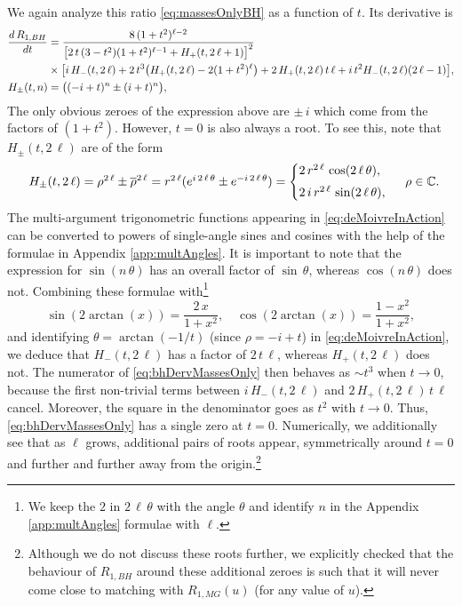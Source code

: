 \documentclass[12pt,a4paper]{article}
\begin{document}
We again analyze this ratio \eqref{eq:massesOnlyBH} as a function of $t$.
%
Its derivative is
\begin{align}
\label{eq:bhDervMassesOnly}\frac{d\,R_{1,BH}}{dt}&=\frac{8\,(1+t^2)^{\ell-2}}{\big[2\,t\,(3-t^2)(1+t^2)^{\ell-1}+H_+(t,2\,\ell+1)\big]^2}\\
&\times \big[i\,H_-(t,2\,\ell)+2\,t^3\big(H_+(t,2\,\ell)-2(1+t^2)^\ell\big)+2\,H_+(t,2\,\ell)\,t\,\ell+i\,t^2H_-(t,2\,\ell)(2\,\ell-1)\big],\notag\\
\nonumber H_{\pm}(t,n)&=\big((-i+t)^n\pm(i+t)^n\big),
\end{align}
The only obvious zeroes of the expression above are $\pm\,i$ which come from the factors of $(1+t^2)$. However, $t=0$ is also always a root. To see this, note that $H_{\pm}(t,2\,\ell)$ are of the form
\begin{align}
\begin{array}{rcl}
H_{\pm}(t,2\,\ell)=\rho^{2\,\ell}\pm\overline{\rho}^{2\,\ell}=r^{2\,\ell}(e^{i\,2\,\ell\,\theta}\pm e^{-i\,2\,\ell\,\theta})=
\left\{\begin{array}{@{}l@{}}
2\,r^{2\,\ell}\,\cos(2\,\ell\,\theta),\vspace{1mm}\\[\jot]
2\,i\,r^{2\,\ell}\,\sin(2\,\ell\,\theta),\vspace{1mm}
\vspace{-1mm}\end{array}\right.
\end{array}\quad\rho\in\mathbb{C}\label{eq:deMoivreInAction}.
\end{align}
The multi-argument trigonometric functions appearing in \eqref{eq:deMoivreInAction} can be converted to powers of single-angle sines and cosines with the help of the formulae in Appendix \ref{app:multAngles}. It is important to note that the expression for $\sin(n\,\theta)$ has an overall factor of $\sin\,\theta$, whereas $\cos(n\,\theta)$ does not. Combining these formulae with\footnote{We keep the $2$ in $2\,\ell\,\theta$ with the angle $\theta$ and identify $n$ in the Appendix \ref{app:multAngles} formulae with $\ell$.}
\begin{equation}
\sin(2\arctan(x))=\frac{2\,x}{1+x^2},\quad \cos(2\arctan(x))=\frac{1-x^2}{1+x^2},
\end{equation}
and identifying $\theta=\arctan(-1/t)$ (since $\rho=-i+t$) in \eqref{eq:deMoivreInAction}, we deduce that $H_-(t,2\,\ell)$ has a factor of $2\,t\,\ell$, whereas $H_+(t,2\,\ell)$ does not. The numerator of \eqref{eq:bhDervMassesOnly} then behaves as $\sim t^3$ when $t\rightarrow0$, because the first non-trivial terms between $i\,H_-(t,2\,\ell)$ and $2\,H_+(t,2\,\ell)\,t\,\ell$ cancel. Moreover, the square in the denominator goes as $t^2$ with $t\rightarrow0$. Thus, \eqref{eq:bhDervMassesOnly} has a single zero at $t=0$. Numerically, we additionally see that as $\ell$ grows, additional pairs of roots appear, symmetrically around $t=0$ and further and further away from the origin.\footnote{Although we do not discuss these roots further, we explicitly checked that the behaviour of $R_{1,BH}$ around these additional zeroes is such that it will never come close to matching with $R_{1,MG}(u)$ (for any value of $u$).}
\end{document}
